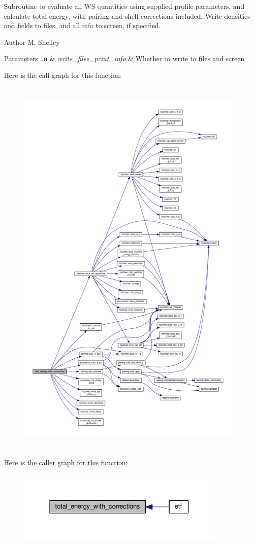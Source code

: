 Subroutine to evaluate all WS quantities using supplied profile parameters, and calculate total energy, with pairing and shell corrections included. Write densities and fields to files, and all info to screen, if specified. 

\begin{DoxyAuthor}{Author}
M. Shelley 
\end{DoxyAuthor}

\begin{DoxyParams}[1]{Parameters}
\mbox{\tt in}  & {\em write\+\_\+files\+\_\+print\+\_\+info} & Whether to write to files and screen \\
\hline
\end{DoxyParams}
Here is the call graph for this function\+:
\nopagebreak
\begin{figure}[H]
\begin{center}
\leavevmode
\includegraphics[height=550pt]{etf_8f90_a48fed0623ded12967501f647461fb1cb_cgraph}
\end{center}
\end{figure}
Here is the caller graph for this function\+:
\nopagebreak
\begin{figure}[H]
\begin{center}
\leavevmode
\includegraphics[width=291pt]{etf_8f90_a48fed0623ded12967501f647461fb1cb_icgraph}
\end{center}
\end{figure}
